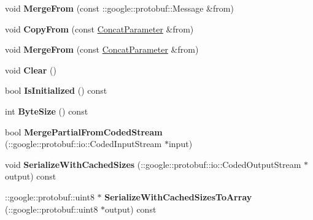 \begin{DoxyCompactItemize}
void {\bfseries Merge\+From} (const \+::google\+::protobuf\+::\+Message \&from)
\item 
\mbox{\label{classcaffe_1_1_concat_parameter_adfb0739cb75acc3dd2ce4feac184eb67}} 
void {\bfseries Copy\+From} (const \mbox{\hyperlink{classcaffe_1_1_concat_parameter}{Concat\+Parameter}} \&from)
\item 
\mbox{\label{classcaffe_1_1_concat_parameter_a61f89193d1a9d0ea7d0b864e9726b4f5}} 
void {\bfseries Merge\+From} (const \mbox{\hyperlink{classcaffe_1_1_concat_parameter}{Concat\+Parameter}} \&from)
\item 
\mbox{\label{classcaffe_1_1_concat_parameter_ad13d427739495b3a5239cd117a55b125}} 
void {\bfseries Clear} ()
\item 
\mbox{\label{classcaffe_1_1_concat_parameter_a2e35298de397403ad3df1c0196e5bcb5}} 
bool {\bfseries Is\+Initialized} () const
\item 
\mbox{\label{classcaffe_1_1_concat_parameter_aa9ef0004be47f44ddc1dacd6d690dc35}} 
int {\bfseries Byte\+Size} () const
\item 
\mbox{\label{classcaffe_1_1_concat_parameter_a43bd17504792846e33eb5f2b3bfd9ab5}} 
bool {\bfseries Merge\+Partial\+From\+Coded\+Stream} (\+::google\+::protobuf\+::io\+::\+Coded\+Input\+Stream $\ast$input)
\item 
\mbox{\label{classcaffe_1_1_concat_parameter_a10acb35da1833e934b94795472939f0a}} 
void {\bfseries Serialize\+With\+Cached\+Sizes} (\+::google\+::protobuf\+::io\+::\+Coded\+Output\+Stream $\ast$output) const
\item 
\mbox{\label{classcaffe_1_1_concat_parameter_a7717179cbf9d6c217b45973fd576e62b}} 
\+::google\+::protobuf\+::uint8 $\ast$ {\bfseries Serialize\+With\+Cached\+Sizes\+To\+Array} (\+::google\+::protobuf\+::uint8 $\ast$output) const
\item 
\mbox{\label{classcaffe_1_1_concat_parameter_a0a774fe9336da1e0ff7db2d93fabea50}} 

\end{DoxyCompactItemize}
